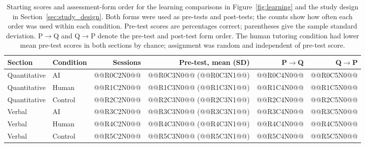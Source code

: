 \begin{table}[t]\centering%
\caption{Starting scores and assessment-form order for the learning comparisons in Figure~\ref{fig:learning} and the study design in Section~\ref{sec:study_design}. Both forms were used as pre-tests and post-tests; the counts show how often each order was used within each condition. Pre-test scores are percentages correct; parentheses give the sample standard deviation. P$\to$Q and Q$\to$P denote the pre-test and post-test form order. The human tutoring condition had lower mean pre-test scores in both sections by chance; assignment was random and independent of pre-test score.}\label{tab:baseline}
\begin{tabular}{llrrrr}\toprule
Section & Condition & Sessions & Pre-test, mean (SD) & P$\to$Q & Q$\to$P\\\midrule
Quantitative & AI & @@R0C2N0@@ & @@R0C3N0@@ (@@R0C3N1@@) & @@R0C4N0@@ & @@R0C5N0@@\\
Quantitative & Human & @@R1C2N0@@ & @@R1C3N0@@ (@@R1C3N1@@) & @@R1C4N0@@ & @@R1C5N0@@\\
Quantitative & Control & @@R2C2N0@@ & @@R2C3N0@@ (@@R2C3N1@@) & @@R2C4N0@@ & @@R2C5N0@@\\
\midrule
Verbal & AI & @@R3C2N0@@ & @@R3C3N0@@ (@@R3C3N1@@) & @@R3C4N0@@ & @@R3C5N0@@\\
Verbal & Human & @@R4C2N0@@ & @@R4C3N0@@ (@@R4C3N1@@) & @@R4C4N0@@ & @@R4C5N0@@\\
Verbal & Control & @@R5C2N0@@ & @@R5C3N0@@ (@@R5C3N1@@) & @@R5C4N0@@ & @@R5C5N0@@\\
\bottomrule\end{tabular}\end{table}